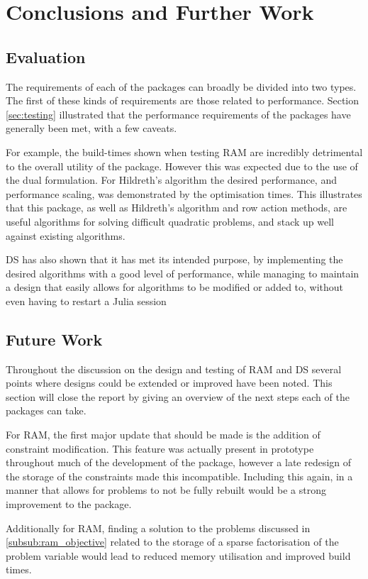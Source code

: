 \section{Conclusions and Further Work}\label{sec:conclusion}

\subsection{Evaluation}
The requirements of each of the packages can broadly be divided into two types. The first of these kinds of requirements are those related to performance. Section \ref{sec:testing} illustrated that the performance requirements of the packages have generally been met, with a few caveats. 

For example, the build-times shown when testing \ac{RAM} are incredibly detrimental to the overall utility of the package. However this was expected due to the use of the dual formulation. For Hildreth's algorithm the desired performance, and performance scaling, was demonstrated by the optimisation times. This illustrates that this package, as well as Hildreth's algorithm and row action methods, are useful algorithms for solving difficult quadratic problems, and stack up well against existing algorithms. 

\ac{DS} has also shown that it has met its intended purpose, by implementing the desired algorithms with a good level of performance, while managing to maintain a design that easily allows for algorithms to be modified or added to, without even having to restart a Julia session

\subsection{Future Work}
Throughout the discussion on the design and testing of \ac{RAM} and \ac{DS} several points where designs could be extended or improved have been noted. This section will close the report by giving an overview of the next steps each of the packages can take.

For \ac{RAM}, the first major update that should be made is the addition of constraint modification. This feature was actually present in prototype throughout much of the development of the package, however a late redesign of the storage of the constraints made this incompatible. Including this again, in a manner that allows for problems to not be fully rebuilt would be a strong improvement to the package. 

Additionally for RAM, finding a solution to the problems discussed in \ref{subsub:ram_objective} related to the storage of a sparse factorisation of the problem variable would lead to reduced memory utilisation and improved build times.

